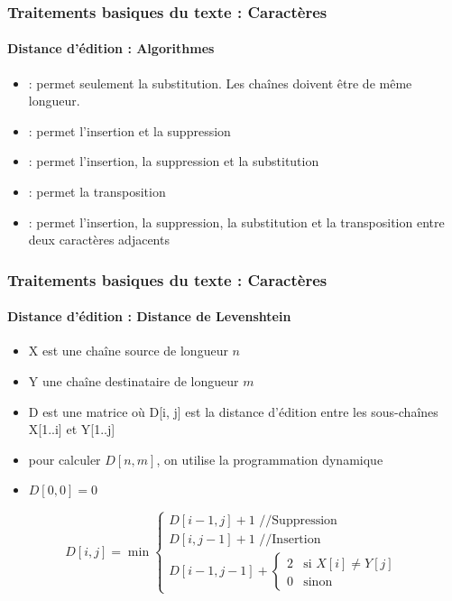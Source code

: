 \documentclass[xcolor=table]{beamer}
\begin{document}
\begin{frame}
\frametitle{Traitements basiques du texte : Caractères}
\framesubtitle{Distance d'édition : Algorithmes}

\begin{itemize}
	\item {} : permet seulement la substitution. Les chaînes doivent être de même longueur. 
	\item {} : permet l'insertion et la suppression
	\item {} : permet l'insertion, la suppression et la substitution
	\item {} : permet la transposition
	\item {} : permet l'insertion, la suppression, la substitution et la transposition entre deux caractères adjacents
\end{itemize}

\end{frame}

\begin{frame}
\frametitle{Traitements basiques du texte : Caractères}
\framesubtitle{Distance d'édition : Distance de Levenshtein}

\begin{itemize}
	\item X est une chaîne source de longueur $n$
	\item Y une chaîne destinataire de longueur $m$
	\item D est une matrice où D[i, j] est la distance d'édition entre les sous-chaînes X[1..i] et Y[1..j]
	\item pour calculer $D[n, m]$, on utilise la programmation dynamique
	\item $D[0, 0] = 0$
\end{itemize}

\[
D[i, j] = \min 
\begin{cases}
D[i - 1, j] + 1 \text{ //Suppression}\\
D[i, j-1] + 1 \text{ //Insertion}\\
D[i-1, j-1] + \begin{cases}
2 & \text{si } X[i] \ne Y[j] \\
0 & \text{sinon}
\end{cases}
\end{cases}
\]

\end{frame}
\end{document}
